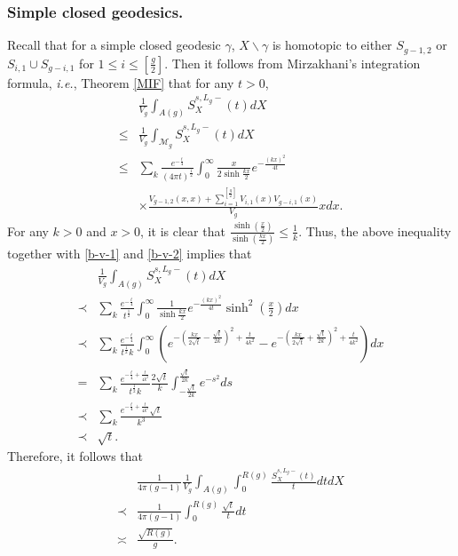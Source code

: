 \documentclass[11pt]{amsart}
\makeatletter
\newcommand{\M}{\mathcal{M}}
\newcommand{\ie}{\textit{i.e.\@}}
\theoremstyle{plain}
\newcommand{\be}{\begin{equation}}
\newcommand{\ene}{\end{equation}}
\theoremstyle{definition}
\theoremstyle{remark}
\makeatother
\begin{document}
\subsubsection{Simple closed geodesics.}
Recall that for a simple closed  geodesic $\gamma$,  $X\backslash\gamma$ is homotopic to either $S_{g-1,2}$ or $S_{i,1}\cup S_{g-i,1}$ for $1\leq i\leq \left[\frac{g}{2}\right]$.  Then it follows from Mirzakhani's integration formula, \ie, Theorem \ref{MIF} that for any $t>0$, 
\be \nonumber
\begin{aligned}
&\frac{1}{V_g}\int_{A(g)}S_X^{s,L_g-}(t)dX\\
\leq & \frac{1}{V_g}\int_{\M_g}S_X^{s,L_g-}(t)dX\\
\leq&\sum_{k}\frac{e^{-\frac{t}{4}}}{(4\pi t)^{\frac12}}\int_0^\infty \frac{x}{2\sinh \frac{kx}{2}}e^{-\frac{(kx)^2}{4t}}\\
&\times \frac{V_{g-1,2}(x,x)+\sum_{i=1}^{\left[\frac{g}{2}\right]}V_{i,1}(x)V_{g-i,1}(x)}{V_g} xdx.
\end{aligned}
\ene
For any $k>0$ and $x>0$, it is clear that $\frac{\sinh \left(\frac{x}{2}\right)}{\sinh \left(\frac{kx}{2}\right)}\leq \frac{1}{k}$. Thus, the above inequality together with \eqref{b-v-1} and \eqref{b-v-2} implies that 
    $$
\begin{aligned}
   &\frac{1}{V_g}\int_{A(g)}S_X^{s,L_g-}(t)dX\\
   \prec&\sum_{k}\frac{e^{-\frac{t}{4}}}{t^{\frac12}}\int_0^\infty \frac{1}{\sinh \frac{kx}{2}}e^{-\frac{(kx)^2}{4t}}\sinh^2\left(\frac{x}{2}\right)dx\\
    \prec&\sum_{k}\frac{e^{-\frac{t}{4}}}{ t^{\frac12}k}\int_0^\infty \left( 
   e^{-\left(\frac{kx}{2\sqrt{t}}-\frac{\sqrt{t}}{2k}\right)^2+
   \frac{t}{4k^2}}-e^{-\left(\frac{kx}{2\sqrt{t}}+\frac{\sqrt{t}}{2k}\right)^2+
   \frac{t}{4k^2}}
   \right)dx\\
   =&\sum_{k}\frac{e^{-\frac{t}{4}+\frac{t}{4k^2}}}{ t^{\frac12}k}\frac{2\sqrt{t}}{k}\int_{-\frac{\sqrt{t}}{2k}}^{\frac{\sqrt{t}}{2k}}e^{-s^2}ds\\
   \prec &\sum_{k}\frac{e^{-\frac{t}{4}+\frac{t}{4k^2}}\sqrt{t}}{k^3}\\
   \prec &\sqrt{t}.
\end{aligned}
$$
Therefore, it follows that \begin{equation}  \label{bound simple L_g-} 
\begin{aligned}
&\frac{1}{4\pi(g-1)}\frac{1}{V_g}\int_{A(g)}  \int_0^{R(g)}\frac{S_X^{s,L_g-}(t)}{t}dt dX\\
\prec & \frac{1}{4\pi(g-1)}\int_0^{R(g)}\frac{\sqrt{t}}{t}dt\\
\asymp & \frac{\sqrt{R(g)}}{g}.   
\end{aligned}
\end{equation}
\end{document}
